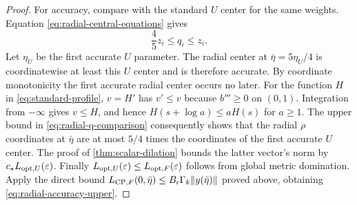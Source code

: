 \begin{proof}
For accuracy, compare with the standard $U$ center for the same
weights. Equation \eqref{eq:radial-central-equations} gives
\begin{equation}
 \frac45z_i\leq q_i\leq z_i.
 \label{eq:radial-q-comparison}
\end{equation}
Let $\eta_U$ be the first accurate $U$ parameter. The radial
center at $\bar\eta=5\eta_U/4$ is coordinatewise at least this
$U$ center and is therefore accurate. By coordinate monotonicity the first
accurate radial center occurs no later.
For the function $H$ in \eqref{eq:standard-profile},
$v=H'$ has $v'\leq v$ because $b'''\geq0$ on $(0,1)$.
Integration from $-\infty$ gives $v\leq H$, and hence
$H(s+\log a)\leq aH(s)$ for $a\geq1$.
The upper bound in \eqref{eq:radial-q-comparison} consequently
shows that the radial $\rho$ coordinates at $\bar\eta$ are at
most $5/4$ times the coordinates of the first accurate $U$ center.
The proof of \cref{thm:scalar-dilation} bounds the latter vector's
norm by $c_\star L_{\mathrm{opt},U}(\varepsilon)$.
Finally $L_{\mathrm{opt},U}(\varepsilon)\leq L_{\mathrm{opt},F}(\varepsilon)$ follows from
global metric domination. Apply the direct bound
$L_{\mathrm{CP},F}(0,\bar\eta)\leq B_{\mathrm r}\Gamma_k\lVert y(\bar\eta)\rVert$
proved above, obtaining \eqref{eq:radial-accuracy-upper}.
\end{proof}

